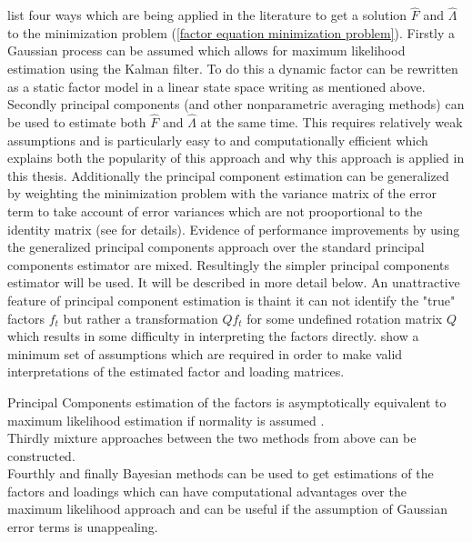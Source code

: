 \documentclass[11pt]{article}
\begin{document}
\citet{stock2011dynamic} list four ways which are being applied in the literature to get a solution $\hat F$ and $\hat \Lambda$ to the minimization problem (\ref{factor equation minimization problem}). Firstly a Gaussian process can be assumed which allows for maximum likelihood estimation using the Kalman filter. To do this a dynamic factor can be rewritten as a static factor model in a linear state space writing as mentioned above. \\
Secondly principal components (and other nonparametric averaging methods) can be used to estimate both $\hat F$ and $\hat \Lambda$ at the same time. This requires relatively weak assumptions and is particularly easy to and computationally efficient which explains both the popularity of this approach and why this approach is applied in this thesis. Additionally the principal component estimation can be generalized by weighting the minimization problem with the variance matrix of the error term to take account of error variances which are not prooportional to the identity matrix (see \citet{stock2011dynamic} for details). Evidence of performance improvements by using the generalized principal components approach over the standard principal components estimator are mixed. Resultingly the simpler principal components estimator will be used. It will be described in more detail below. An unattractive feature of principal component estimation is thaint it can not identify the "true" factors $f_t$ but rather a transformation $Q f_t$ for some undefined rotation matrix $Q$ which results in some difficulty in interpreting the factors directly. \citet{bai2013principal} show a minimum set of assumptions which are required in order to make valid interpretations of the estimated factor and loading matrices.

Principal Components estimation of the factors is asymptotically equivalent to maximum likelihood estimation if normality is assumed \citep{bai2003inferential}. \\
Thirdly mixture approaches between the two methods from above can be constructed. \\
Fourthly and finally Bayesian methods can be used to get estimations of the factors and loadings which can have computational advantages over the maximum likelihood approach and can be useful if the assumption of Gaussian error terms is unappealing. \\
\end{document}
